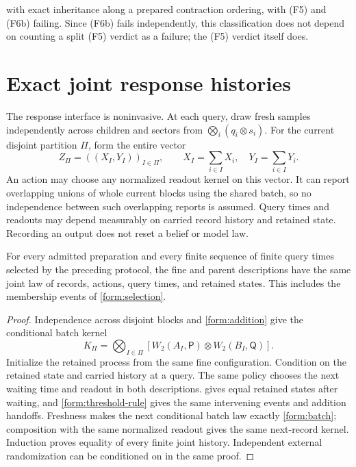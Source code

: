 with exact inheritance along a prepared contraction ordering, with (F5) and (F6b) failing. Since (F6b) fails independently, this classification does not depend on counting a split (F5) verdict as a failure; the (F5) verdict itself does.

\section{Exact joint response histories}

The response interface is noninvasive. At each query, draw fresh samples
independently across children and sectors from $\bigotimes_i(q_i\otimes s_i)$.
For the current disjoint partition $\Pi$, form the entire vector
\begin{equation}
 Z_\Pi=((X_I,Y_I))_{I\in\Pi},\qquad
 X_I=\sum_{i\in I}X_i,\quad Y_I=\sum_{i\in I}Y_i.
\end{equation}
An action may choose any normalized readout kernel on this vector. It can
report overlapping unions of whole current blocks using the shared batch,
so no independence between such overlapping reports is assumed. Query
times and readouts may depend measurably on carried record history and
retained state. Recording an output does not reset a belief or model law.

For every admitted preparation and every finite sequence of finite query
times selected by the preceding protocol, the fine and parent descriptions
have the same joint law of records, actions, query times, and retained
states. This includes the membership events of \cref{form:selection}.

\begin{proof}
Independence across disjoint blocks and \cref{form:addition} give the
conditional batch kernel
\begin{equation}
 K_\Pi=\bigotimes_{I\in\Pi}
       [W_2(A_I,\mathsf P)\otimes W_2(B_I,\mathsf Q)].
 \label{form:batch}
\end{equation}
Initialize the retained process from the same fine configuration.
Condition on the retained state and carried history at a query. The same
policy chooses the next waiting time and readout in both descriptions.
 gives equal retained states after waiting, and
\cref{form:threshold-rule} gives the same intervening events and addition handoffs.
Freshness makes the next conditional batch law exactly \cref{form:batch};
composition with the same normalized readout gives the same next-record
kernel. Induction proves equality of every finite joint history.
Independent external randomization can be conditioned on in the same proof.
\end{proof}

